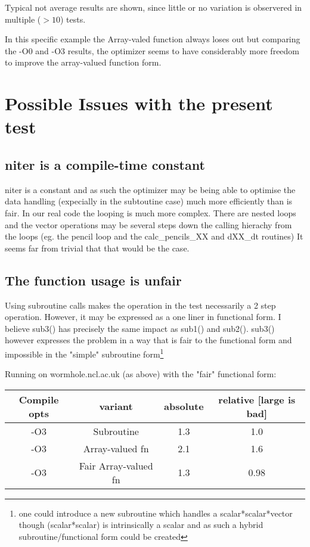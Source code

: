 \documentclass[a4paper,twoside,12pt]{article}
\begin{document}
Typical not average results are shown, since little or no variation 
is observered in multiple ($> 10$) tests.

In this specific example the Array-valed function always loses out but
comparing the -O0 and -O3 results, the optimizer seems to have considerably 
more freedom to improve the array-valued function form.

\chapter{Possible Issues with the present test}
\section{niter is a compile-time constant}
niter is a constant and as such the optimizer may be being able to optimise
the data handling (expecially in the subtoutine case) much more efficiently
than is fair.  In our real code the looping is much more complex.  There are
nested loops and the vector operations may be several steps down the calling
hierachy from the loops  (eg. the pencil loop and the calc\_pencils\_XX and
dXX\_dt routines)
It seems far from trivial that that would be the case.

\section{The function usage is unfair}
Using subroutine calls makes the operation in the test necessarily a 2 step
operation.  However, it may be expressed as a one liner in functional form.
I believe sub3() has precisely the same impact as sub1() and
sub2().  sub3() however expresses the problem in a way that is fair
to the functional form and impossible in the "simple" subroutine
form\footnote{one could introduce a new subroutine which handles a
scalar*scalar*vector though (scalar*scalar) is intrinsically a
scalar and as such a hybrid subroutine/functional form could be created}

Running on wormhole.ncl.ac.uk (as above) with the "fair" functional form:

\begin{tabular}{cccc}
   Compile opts     &       variant       &     absolute & relative [large is bad] \\
\hline
   -O3     &  Subroutine            &    1.3    &   1.0 \\
   -O3     &  Array-valued fn       &    2.1    &   1.6 \\
   -O3     &  Fair Array-valued fn  &    1.3    &   0.98 \\
\hline
\end{tabular}
\end{document}
